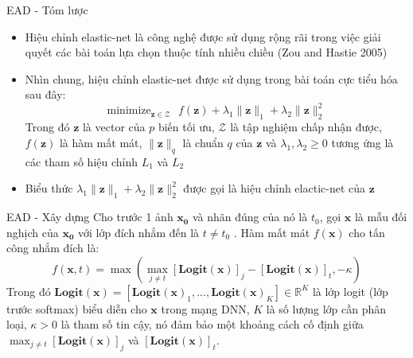 \begin{frame}{EAD - Tóm lược}
    \begin{itemize}
        \item Hiệu chỉnh elastic-net là công nghệ được sử dụng rộng rãi trong việc giải quyết 
        các bài toán lựa chọn thuộc tính nhiều chiều (Zou and Hastie 2005)

        \item Nhìn chung, hiệu chỉnh elastic-net được sử dụng trong bài toán cực 
        tiểu hóa sau đây:
        \begin{equation}
            \label{eq:3}
            \text{minimize}_{\mathbf{z} \in \mathcal{Z}} \text{ }
            f(\mathbf{z}) + \lambda_1 \lVert \mathbf{z} \rVert_1
            + \lambda_2 \lVert \mathbf{z} \rVert_2^2
        \end{equation}
        Trong đó $\mathbf{z}$ là vector của $p$ biến tối ưu, $\mathcal{Z}$ là tập nghiệm 
        chấp nhận được, $f(\mathbf{z})$ là hàm mất mát, $\lVert \mathbf{z} \rVert_q$ là 
        chuẩn $q$ của $\mathbf{z}$ và $\lambda_1, \lambda_2 \geq 0$ tương ứng là các tham số hiệu 
        chỉnh $L_1$ và $L_2$

        \item Biểu thức $\lambda_1 \lVert \mathbf{z} \rVert_1 + \lambda_2 
        \lVert \mathbf{z} \rVert_2^2$ được gọi là hiệu chỉnh elactic-net của $\mathbf{z}$
    \end{itemize}
\end{frame}

\begin{frame}{EAD - Xây dựng}
    Cho trước 1 ảnh $\mathbf{x_0}$ và nhãn đúng của nó là $t_0$, 
    gọi $\mathbf{x}$ là mẫu đối nghịch của $\mathbf{x_0}$ với lớp đích nhắm đến là $t \neq t_0$ . Hàm mất mát 
    $f(\mathbf{x})$ cho tấn công nhắm đích là:
    \begin{equation}
        \label{eq:4}
        f(\mathbf{x}, t) = \max { \left( \max_{j \neq t} [\textbf{Logit}(\mathbf{x})]_j - 
        [\textbf{Logit}(\mathbf{x})]_t, -\kappa \right) }
    \end{equation}
    Trong đó $\textbf{Logit}(\mathbf{x}) = [\textbf{Logit}(\mathbf{x})_1, ..., 
    \textbf{Logit}(\mathbf{x})_K] 
    \in \mathbb{R}^K$ là lớp logit (lớp trước softmax) biểu diễn cho $\mathbf{x}$ trong mạng DNN, $K$
    là số lượng lớp cần phân loại, $\kappa > 0$ là tham số tin cậy, nó đảm bảo một khoảng 
    cách cố định giữa $\max_{j \neq t} [\textbf{Logit}(\mathbf{x})]_j$ và $[\textbf{Logit}(\mathbf{x})]_t$.
\end{frame}

